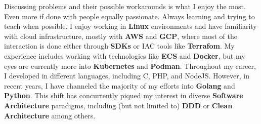 

%
\begin{cventries}

  \cventry
  {}
  {}
  {}
  {}
  {Discussing problems and their possible workarounds is what I enjoy the most. Even more if done with people equally passionate. Always learning and trying to teach when possible. I enjoy working in \textbf{Linux} environments and have familiarity with cloud infrastructure, mostly with \textbf{AWS} and \textbf{GCP}, where most of the interaction is done either through \textbf{SDKs} or IAC tools like \textbf{Terrafom}. My experience includes working with technologies like \textbf{ECS} and \textbf{Docker}, but my eyes are currently more into \textbf{Kubernetes} and \textbf{Podman}. Throughout my career, I developed in different languages, including C, PHP, and NodeJS. However, in recent years, I have channeled the majority of my efforts into \textbf{Golang} and \textbf{Python}. This shift has concurrently piqued my interest in diverse \textbf{Software Architecture} paradigms, including (but not limited to) \textbf{DDD} or \textbf{Clean Architecture} among others.}
\end{cventries}
